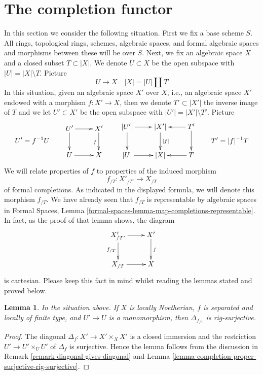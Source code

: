 \documentclass[10pt,a4paper]{amsart}
\theoremstyle{plain}
\newtheorem{lemma}[subsection]{Lemma}
\theoremstyle{definition}
\theoremstyle{remark}
\numberwithin{equation}{subsection}
\begin{document}
\section{The completion functor}
\label{section-completion-functor}

\noindent
In this section we consider the following situation.
First we fix a base scheme $S$. All rings, topological rings,
schemes, algebraic spaces, and formal algebraic spaces and
morphisms between these will be over $S$. Next, we fix an
algebraic space $X$ and a closed subset $T \subset |X|$.
We denote $U \subset X$ be the open subspace with $|U| = |X| \setminus T$.
Picture
$$
U \to X \quad |X| = |U| \amalg T
$$
In this situation, given an algebraic space $X'$ over $X$, i.e., an
algebraic space $X'$ endowed with a morphism $f : X' \to X$, then we
denote $T' \subset |X'|$ the inverse image of $T$ and we let $U' \subset X'$
be the open subspace with $|U'| = |X'| \setminus T'$. Picture
$$
U' = f^{-1}U
\quad\quad
\vcenter{
\xymatrix{
U' \ar[d] \ar[r] & X' \ar[d]_f \\
U \ar[r] & X
}
}
\quad\quad
\vcenter{
\xymatrix{
|U'| \ar[r] \ar[d] & |X'| \ar[d]^{|f|} & T' \ar[l] \ar[d] \\
|U| \ar[r] & |X| & T \ar[l]
}
}
\quad\quad
T' = |f|^{-1}T
$$
We will relate properties of $f$ to properties of the induced morphism
$$
f_{/T} : X'_{/T'} \longrightarrow X_{/T}
$$
of formal completions. As indicated in the displayed formula, we will
denote this morphism $f_{/T}$. We have already seen that
$f_{/T}$ is representable by algebraic spaces in
Formal Spaces, Lemma
\ref{formal-spaces-lemma-map-completions-representable}.
In fact, as the proof of that lemma shows, the diagram
$$
\xymatrix{
X'_{/T'} \ar[d]_{f_{/T}} \ar[r] & X' \ar[d]^f \\
X_{/T} \ar[r] & X
}
$$
is cartesian. Please keep this fact in mind whilst reading the lemmas stated
and proved below.

\begin{lemma}
\label{lemma-separated-mono-open-diagonal-rig-surjective}
In the situation above. If $X$ is locally Noetherian,
$f$ is separated and locally of finite type, and $U' \to U$ is
a monomorphism, then $\Delta_{f_{/T}}$ is rig-surjective.
\end{lemma}

\begin{proof}
The diagonal $\Delta_f : X' \to X' \times_X X'$ is a closed
immersion and the restriction $U' \to U' \times_U U'$ of $\Delta_f$
is surjective. Hence the lemma follows from the discussion in
Remark \ref{remark-diagonal-gives-diagonal} and
Lemma \ref{lemma-completion-proper-surjective-rig-surjective}.
\end{proof}
\end{document}
